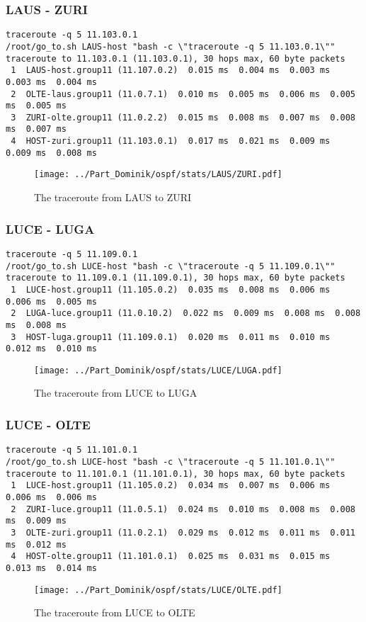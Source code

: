 \subsubsection{LAUS - ZURI}
\begin{lstlisting}
traceroute -q 5 11.103.0.1
/root/go_to.sh LAUS-host "bash -c \"traceroute -q 5 11.103.0.1\""
traceroute to 11.103.0.1 (11.103.0.1), 30 hops max, 60 byte packets
 1  LAUS-host.group11 (11.107.0.2)  0.015 ms  0.004 ms  0.003 ms  0.003 ms  0.004 ms
 2  OLTE-laus.group11 (11.0.7.1)  0.010 ms  0.005 ms  0.006 ms  0.005 ms  0.005 ms
 3  ZURI-olte.group11 (11.0.2.2)  0.015 ms  0.008 ms  0.007 ms  0.008 ms  0.007 ms
 4  HOST-zuri.group11 (11.103.0.1)  0.017 ms  0.021 ms  0.009 ms  0.009 ms  0.008 ms
\end{lstlisting}
\begin{figure}[H]
\centering
\texttt{[image: ../Part\_Dominik/ospf/stats/LAUS/ZURI.pdf]}
\caption{The traceroute from LAUS to ZURI}
\end{figure}
\clearpage
\subsubsection{LUCE - LUGA}
\begin{lstlisting}
traceroute -q 5 11.109.0.1
/root/go_to.sh LUCE-host "bash -c \"traceroute -q 5 11.109.0.1\""
traceroute to 11.109.0.1 (11.109.0.1), 30 hops max, 60 byte packets
 1  LUCE-host.group11 (11.105.0.2)  0.035 ms  0.008 ms  0.006 ms  0.006 ms  0.005 ms
 2  LUGA-luce.group11 (11.0.10.2)  0.022 ms  0.009 ms  0.008 ms  0.008 ms  0.008 ms
 3  HOST-luga.group11 (11.109.0.1)  0.020 ms  0.011 ms  0.010 ms  0.012 ms  0.010 ms
\end{lstlisting}
\begin{figure}[H]
\centering
\texttt{[image: ../Part\_Dominik/ospf/stats/LUCE/LUGA.pdf]}
\caption{The traceroute from LUCE to LUGA}
\end{figure}
\clearpage
\subsubsection{LUCE - OLTE}
\begin{lstlisting}
traceroute -q 5 11.101.0.1
/root/go_to.sh LUCE-host "bash -c \"traceroute -q 5 11.101.0.1\""
traceroute to 11.101.0.1 (11.101.0.1), 30 hops max, 60 byte packets
 1  LUCE-host.group11 (11.105.0.2)  0.034 ms  0.007 ms  0.006 ms  0.006 ms  0.006 ms
 2  ZURI-luce.group11 (11.0.5.1)  0.024 ms  0.010 ms  0.008 ms  0.008 ms  0.009 ms
 3  OLTE-zuri.group11 (11.0.2.1)  0.029 ms  0.012 ms  0.011 ms  0.011 ms  0.012 ms
 4  HOST-olte.group11 (11.101.0.1)  0.025 ms  0.031 ms  0.015 ms  0.013 ms  0.014 ms
\end{lstlisting}
\begin{figure}[H]
\centering
\texttt{[image: ../Part\_Dominik/ospf/stats/LUCE/OLTE.pdf]}
\caption{The traceroute from LUCE to OLTE}
\end{figure}
\clearpage
